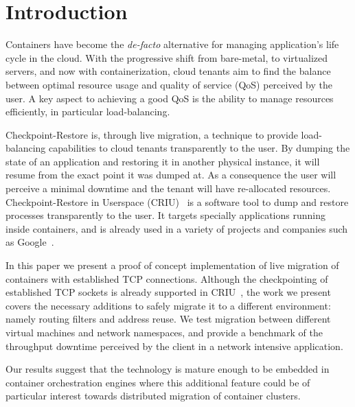 \section{Introduction} \label{sec:introduction}

Containers have become the \textit{de-facto} alternative for managing application's life cycle in the cloud.
With the progressive shift from bare-metal, to virtualized servers, and now with containerization, cloud tenants aim to find the balance between optimal resource usage and quality of service (QoS) perceived by the user.
A key aspect to achieving a good QoS is the ability to manage resources efficiently, in particular load-balancing.

Checkpoint-Restore is, through live migration, a technique to provide load-balancing capabilities to cloud tenants transparently to the user.
By dumping the state of an application and restoring it in another physical instance, it will resume from the exact point it was dumped at.
As a consequence the user will perceive a minimal downtime and the tenant will have re-allocated resources.
Checkpoint-Restore in Userspace (CRIU)~\cite{criu-main-page} is a software tool to dump and restore processes transparently to the user.
It targets specially applications running inside containers, and is already used in a variety of projects and companies such as Google~\cite{Tucker18}.

In this paper we present a proof of concept implementation of live migration of containers with established TCP connections.
Although the checkpointing of established TCP sockets is already supported in CRIU~\cite{criu-tcp}, the work we present covers the necessary additions to safely migrate it to a different environment: namely routing filters and address reuse.
We test migration between different virtual machines and network namespaces, and provide a benchmark of the throughput downtime perceived by the client in a network intensive application.

Our results suggest that the technology is mature enough to be embedded in container orchestration engines where this additional feature could be of particular interest towards distributed migration of container clusters.
